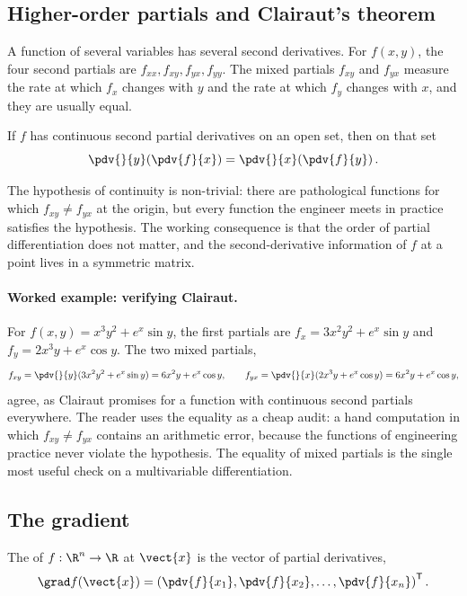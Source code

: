 \subsection{Higher-order partials and Clairaut's theorem}

A function of several variables has several second derivatives. For
$f(x, y)$, the four second partials are $f_{xx}, f_{xy}, f_{yx},
f_{yy}$. The mixed partials $f_{xy}$ and $f_{yx}$ measure the rate
at which $f_{x}$ changes with $y$ and the rate at which $f_{y}$
changes with $x$, and they are usually equal.

\begin{theorem}
If $f$ has continuous second partial derivatives on an open set,
then on that set
\[
\pdv{}{y}\!\left(\pdv{f}{x}\right) =
\pdv{}{x}\!\left(\pdv{f}{y}\right).
\]
\end{theorem}

The hypothesis of continuity is non-trivial: there are pathological
functions for which $f_{xy} \neq f_{yx}$ at the origin, but every
function the engineer meets in practice satisfies the hypothesis.
The working consequence is that the order of partial differentiation
does not matter, and the second-derivative information of $f$ at a
point lives in a symmetric matrix.

\paragraph{Worked example: verifying Clairaut.} For $f(x, y) =
x^{3} y^{2} + e^{x} \sin y$, the first partials are $f_{x} = 3 x^{2}
y^{2} + e^{x}\sin y$ and $f_{y} = 2 x^{3} y + e^{x}\cos y$. The two
mixed partials,
\[
f_{xy} = \pdv{}{y}(3 x^{2} y^{2} + e^{x}\sin y) = 6 x^{2} y +
e^{x}\cos y, \qquad
f_{yx} = \pdv{}{x}(2 x^{3} y + e^{x}\cos y) = 6 x^{2} y +
e^{x}\cos y,
\]
agree, as Clairaut promises for a function with continuous second
partials everywhere. The reader uses the equality as a cheap audit:
a hand computation in which $f_{xy} \neq f_{yx}$ contains an
arithmetic error, because the functions of engineering practice
never violate the hypothesis. The equality of mixed partials is the
single most useful check on a multivariable differentiation.

\subsection{The gradient}

\begin{definition}[Gradient]
The  of $f : \R^{n} \to \R$ at $\vect{x}$ is the
vector of partial derivatives,
\[
\grad f(\vect{x}) = \left(\pdv{f}{x_{1}}, \pdv{f}{x_{2}}, \ldots,
\pdv{f}{x_{n}}\right)^{\mathsf{T}}.
\]
\end{definition}

